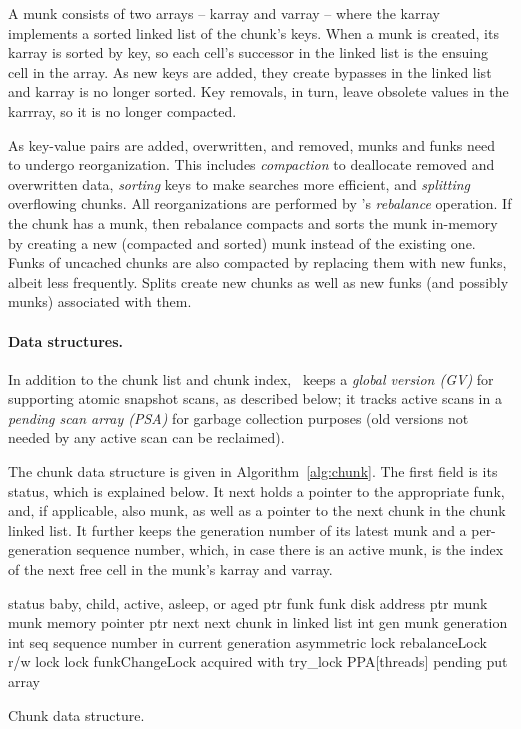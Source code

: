A munk consists of two arrays -- karray and varray -- where the karray implements a sorted linked list of the chunk's keys. 
When a munk is created, its karray is sorted by key, so each cell's successor in the linked list is the ensuing cell in the array.
As new keys are added, they create bypasses in the linked list and karray is no longer sorted.
Key removals, in turn, leave obsolete values in the karrray, so it is no longer compacted.

As key-value pairs are added, overwritten, and removed, munks and funks need to undergo reorganization. This includes  
\emph{compaction} to deallocate removed and overwritten data, 
\emph{sorting} keys to make searches more efficient,  and
\emph{splitting} overflowing chunks.
All reorganizations are performed by \sys's \emph{rebalance} operation.
If the chunk has a munk, then rebalance compacts and sorts the munk in-memory by creating a new 
(compacted and sorted) munk instead of the existing one. 
Funks of uncached chunks are also compacted by replacing them with new funks, albeit less frequently.
Splits  create new chunks as well as new  funks (and possibly munks) associated with them.


\paragraph{Data structures.}

In addition to the chunk list and chunk index, \sys\ keeps a \emph{global version (GV)} for supporting atomic snapshot scans,
as described below; it tracks active scans in a \emph{pending scan array (PSA)} for garbage collection purposes (old 
versions not needed by any active scan can be reclaimed).

The chunk data structure is given in Algorithm~\ref{alg:chunk}. 
The first field is its status, which is explained  below. 
It next holds a pointer to the appropriate funk, and, if applicable, also munk, as well as a pointer to the next 
chunk in the chunk linked list.
It further keeps the generation number of its latest munk and a per-generation sequence number,
which, in case there is an active munk, is the index of the next free cell in the munk's karray and varray.


\begin{algorithm}[htb]
\begin{algorithmic}
\State status \Comment  baby, child, active, asleep, or aged
\State ptr funk \Comment funk disk address
\State ptr munk \Comment munk memory pointer
\State ptr next \Comment next chunk in linked list
\State int gen \Comment munk generation
\State int seq \Comment sequence number in current generation 
\State asymmetric lock rebalanceLock \Comment r/w lock 
\State lock funkChangeLock \Comment acquired with try\_lock 
\State PPA[threads] \Comment pending put array
\end{algorithmic}
\caption{Chunk data structure.}
\label{alg:chunk}
\end{algorithm}


